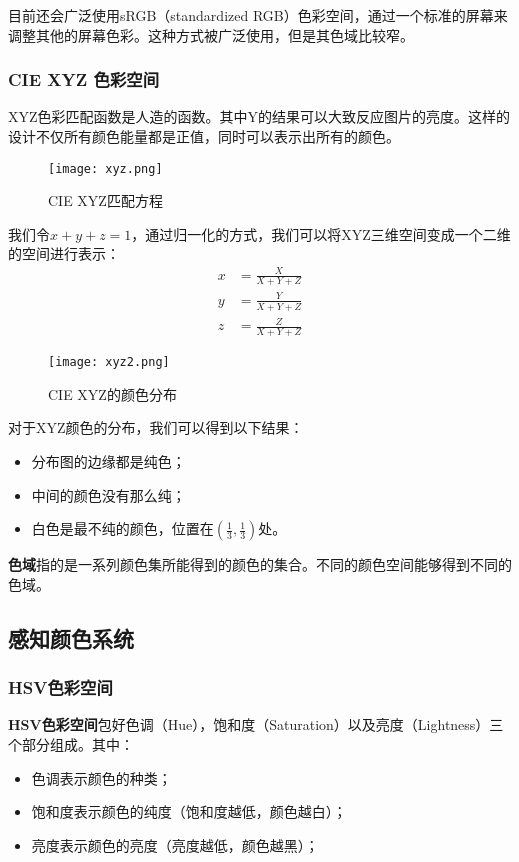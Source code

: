 \documentclass[openany]{progbookcn}
\begin{document}
目前还会广泛使用sRGB（standardized RGB）色彩空间，通过一个标准的屏幕来调整其他的屏幕色彩。这种方式被广泛使用，但是其色域比较窄。

\subsubsection{CIE XYZ 色彩空间}

XYZ色彩匹配函数是人造的函数。其中Y的结果可以大致反应图片的亮度。这样的设计不仅所有颜色能量都是正值，同时可以表示出所有的颜色。

\begin{figure}[H]
	\centering
	\texttt{[image: xyz.png]}
	\caption{CIE XYZ匹配方程}
	\label{fig:xyz}
\end{figure}

我们令$x+y+z=1$，通过归一化的方式，我们可以将XYZ三维空间变成一个二维的空间进行表示：
\begin{equation}
	\begin{split}
		x &=\frac{X}{X+Y+Z} \\
		y &=\frac{Y}{X+Y+Z} \\
		z &=\frac{Z}{X+Y+Z}
	\end{split}
\end{equation}

\begin{figure}[H]
	\centering
	\texttt{[image: xyz2.png]}
	\caption{CIE XYZ的颜色分布}
	\label{fig:xyz2}
\end{figure}

对于XYZ颜色的分布，我们可以得到以下结果：
\begin{itemize}
	\item 分布图的边缘都是纯色；
	\item 中间的颜色没有那么纯；
	\item 白色是最不纯的颜色，位置在$(\frac{1}{3},\frac{1}{3})$处。
\end{itemize}

\textbf{色域}指的是一系列颜色集所能得到的颜色的集合。不同的颜色空间能够得到不同的色域。

\subsection{感知颜色系统}

\subsubsection{HSV色彩空间}

\textbf{HSV色彩空间}包好色调（Hue），饱和度（Saturation）以及亮度（Lightness）三个部分组成。其中：
\begin{itemize}
	\item 色调表示颜色的种类；
	\item 饱和度表示颜色的纯度（饱和度越低，颜色越白）；
	\item 亮度表示颜色的亮度（亮度越低，颜色越黑）；
\end{itemize}
\end{document}
